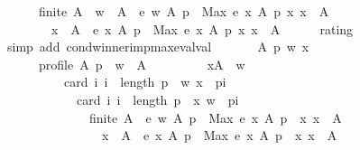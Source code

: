 \begin{isabellebody}
\ \ \ \ \ \ finite\ A\ {\isasymLongrightarrow}\ w\ {\isasymin}\ A\ {\isasymLongrightarrow}\ e\ w\ A\ p\ {\isacharless}{\kern0pt}\ Max\ {\isacharbraceleft}{\kern0pt}e\ x\ A\ p\ {\isacharbar}{\kern0pt}x{\isachardot}{\kern0pt}\ x\ {\isasymin}\ A{\isacharbraceright}{\kern0pt}\ {\isasymLongrightarrow}\isanewline
\ \ \ \ \ \ \ \ x\ {\isasymin}\ A\ {\isasymLongrightarrow}\ e\ x\ A\ p\ {\isacharless}{\kern0pt}\ Max\ {\isacharbraceleft}{\kern0pt}e\ x\ A\ p\ {\isacharbar}{\kern0pt}x{\isachardot}{\kern0pt}\ x\ {\isasymin}\ A{\isacharbraceright}{\kern0pt}{\isachardoublequoteclose}\isanewline
\ \ \ \ \isamarkupfalse%
\ rating\isanewline
\ \ \ \ \isamarkupfalse%
\ {\isacharparenleft}{\kern0pt}simp\ add{\isacharcolon}{\kern0pt}\ cond{\isacharunderscore}{\kern0pt}winner{\isacharunderscore}{\kern0pt}imp{\isacharunderscore}{\kern0pt}max{\isacharunderscore}{\kern0pt}eval{\isacharunderscore}{\kern0pt}val{\isacharparenright}{\kern0pt}\isanewline
\ \ \isamarkupfalse%
\isanewline
\ \ \ \ {\isachardoublequoteopen}{\isasymAnd}A\ p\ w\ x{\isachardot}{\kern0pt}\isanewline
\ \ \ \ \ \ profile\ A\ p\ {\isasymLongrightarrow}\ w\ {\isasymin}\ A\ {\isasymLongrightarrow}\isanewline
\ \ \ \ \ \ \ \ {\isasymforall}x{\isasymin}A\ {\isacharminus}{\kern0pt}\ {\isacharbraceleft}{\kern0pt}w{\isacharbraceright}{\kern0pt}{\isachardot}{\kern0pt}\isanewline
\ \ \ \ \ \ \ \ \ \ card\ {\isacharbraceleft}{\kern0pt}i{\isachardot}{\kern0pt}\ i\ {\isacharless}{\kern0pt}\ length\ p\ {\isasymand}\ {\isacharparenleft}{\kern0pt}w{\isacharcomma}{\kern0pt}\ x{\isacharparenright}{\kern0pt}\ {\isasymin}\ {\isacharparenleft}{\kern0pt}p{\isacharbang}{\kern0pt}i{\isacharparenright}{\kern0pt}{\isacharbraceright}{\kern0pt}\ {\isacharless}{\kern0pt}\isanewline
\ \ \ \ \ \ \ \ \ \ \ \ card\ {\isacharbraceleft}{\kern0pt}i{\isachardot}{\kern0pt}\ i\ {\isacharless}{\kern0pt}\ length\ p\ {\isasymand}\ {\isacharparenleft}{\kern0pt}x{\isacharcomma}{\kern0pt}\ w{\isacharparenright}{\kern0pt}\ {\isasymin}\ {\isacharparenleft}{\kern0pt}p{\isacharbang}{\kern0pt}i{\isacharparenright}{\kern0pt}{\isacharbraceright}{\kern0pt}\ {\isasymLongrightarrow}\isanewline
\ \ \ \ \ \ \ \ \ \ \ \ \ \ finite\ A\ {\isasymLongrightarrow}\ e\ w\ A\ p\ {\isacharless}{\kern0pt}\ Max\ {\isacharbraceleft}{\kern0pt}e\ x\ A\ p\ {\isacharbar}{\kern0pt}\ x{\isachardot}{\kern0pt}\ x\ {\isasymin}\ A{\isacharbraceright}{\kern0pt}\ {\isasymLongrightarrow}\isanewline
\ \ \ \ \ \ \ \ \ \ \ \ \ \ \ \ x\ {\isasymin}\ A\ {\isasymLongrightarrow}\ e\ x\ A\ p\ {\isacharless}{\kern0pt}\ Max\ {\isacharbraceleft}{\kern0pt}e\ x\ A\ p\ {\isacharbar}{\kern0pt}\ x{\isachardot}{\kern0pt}\ x\ {\isasymin}\ A{\isacharbraceright}{\kern0pt}{\isachardoublequoteclose}\isanewline

\end{isabellebody}
